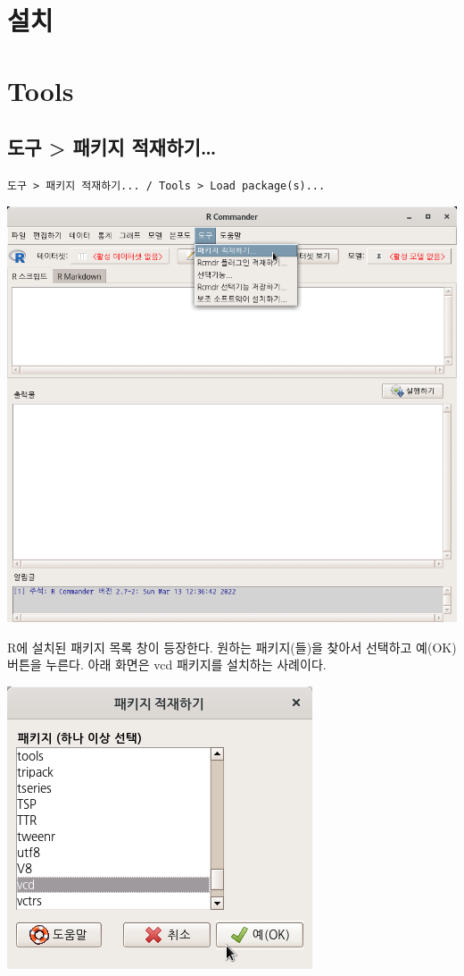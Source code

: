 \documentclass[
]{book}
\begin{document}
\hypertarget{install}{%
\chapter{설치}\label{install}}

\hypertarget{tools}{%
\chapter{Tools}\label{tools}}

\hypertarget{uxb3c4uxad6c-uxd328uxd0a4uxc9c0-uxc801uxc7acuxd558uxae30}{%
\section{도구 \textgreater{} 패키지 적재하기\ldots{}}\label{uxb3c4uxad6c-uxd328uxd0a4uxc9c0-uxc801uxc7acuxd558uxae30}}

\texttt{도구\ \textgreater{}\ 패키지\ 적재하기...\ /\ Tools\ \textgreater{}\ Load\ package(s)...}

\includegraphics{fig/tools-load-pkg-01.png}

R에 설치된 패키지 목록 창이 등장한다. 원하는 패키지(들)을 찾아서 선택하고 예(OK) 버튼을 누른다. 아래 화면은 vcd 패키지를 설치하는 사례이다.

\includegraphics{fig/tools-load-pkg-02.png}
\end{document}

